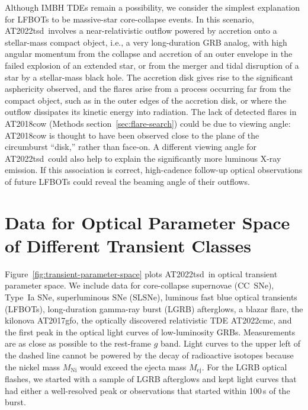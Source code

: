 \documentclass{nature_plusfigure}
\newcommand{\at}{AT2022tsd}
\begin{document}
\begin{methods}
Although IMBH TDEs remain a possibility, we consider the simplest explanation for LFBOTs to be massive-star core-collapse events. In this scenario, \at\ involves a near-relativistic outflow powered by accretion onto a stellar-mass compact object, i.e., a very long-duration GRB analog\cite{Quataert2012}, with high angular momentum from the collapse and accretion of an outer envelope in the failed explosion of an extended star\cite{Perley2021,Metzger2022}, or from the merger and tidal disruption of a star by a stellar-mass black hole\cite{Metzger2022}. The accretion disk gives rise to the significant asphericity observed\cite{Maund2023}, and the flares arise from a process occurring far from the compact object, such as in the outer edges of the accretion disk, or where the outflow dissipates its kinetic energy into radiation. The lack of detected flares in AT2018cow (Methods section~\ref{sec:flare-search}) could be due to viewing angle: AT2018cow is thought to have been observed close to the plane of the circumburst ``disk,'' rather than face-on\cite{Margutti2019,Chen2023b}. A different viewing angle for \at\ could also help to explain the significantly more luminous X-ray emission.
If this association is correct, high-cadence follow-up optical observations of future LFBOTs could reveal the beaming angle of their outflows.

\section{Data for Optical Parameter Space of Different Transient Classes}
\label{sec:data-transient-parameter-space}

Figure~\ref{fig:transient-parameter-space} plots \at\ in optical transient parameter space.
We include data for
core-collapse supernovae (CC~SNe\cite{PerleyBTS,Ho2023}), Type~Ia SNe\cite{PerleyBTS}, superluminous SNe (SLSNe\cite{PerleyBTS}), luminous fast blue optical transients (LFBOTs\cite{Prentice2018,Perley2019,Ho2019,Margutti2019,Perley2021,Ho2020_Koala,Yao2022,Coppejans2020,Ho2022_AT2020xnd,Arcavi2016,Pursiainen2018}), long-duration gamma-ray burst (LGRB) afterglows\cite{Racusin2008,Kann2010}, 
a blazar flare\cite{Nesci2021}, the kilonova AT2017gfo\cite{Kasliwal2017,Villar2017,Cowperthwaite2017,Drout2017}, the optically discovered relativistic TDE AT2022cmc\cite{Andreoni2022}, and the first peak in the optical light curves of low-luminosity GRBs\cite{Galama1998,Campana2006,DElia2018,Ho2020_SN2020bvc}.
Measurements are as close as possible to the rest-frame $g$ band.
Light curves to the upper left of the dashed line\cite{Kasen2017} cannot be powered by the decay of radioactive isotopes because the nickel mass $M_\mathrm{Ni}$ would exceed the ejecta mass $M_\mathrm{ej}$. For the LGRB optical flashes, we started with a sample of LGRB afterglows\cite{Kann2010} and kept light curves that had either a well-resolved peak or observations that started within 100\,s of the burst.


\end{methods}
\end{document}
